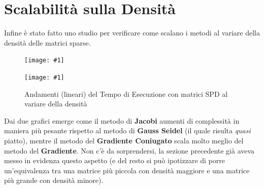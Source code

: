 \documentclass[a4paper,11pt,oneside, table]{article}
\newcommand{\putsubimage}[5] {
  \begin{minipage}{{#4}\linewidth}
	    \centering
      \texttt{[image: \#1]}
	    \caption{#2}\label{#3}
	\end{minipage}
}
\newcommand{\putimagecouple}[2] {
  \begin{figure}[!htb]
      \centering
      #1
      \hspace{0.5cm}
      #2
  \end{figure}
}
\begin{document}
\section{Scalabilit\`a sulla Densit\`a}

Infine \`e stato fatto uno studio per verificare come scalano i metodi al variare della densit\`a delle matrici sparse.

\putimagecouple
  {\putsubimage{./images/001-sparsity-density-elapsed.png}{Andamenti (lineari) del Tempo di Esecuzione con matrici RDD al variare della densit\`a}{png:001-sparsity-density-elapsed}{0.4}{0.99}}
  {\putsubimage{./images/002-sparsity-density-elapsed.png}{Andamenti (lineari) del Tempo di Esecuzione con matrici SPD al variare della densit\`a}{png:002-sparsity-density-elapsed}{0.4}{0.99}}

Dai due grafici emerge come il metodo di \textbf{Jacobi} aumenti di complessit\`a in maniera pi\`u pesante rispetto al metodo di \textbf{Gauss Seidel} (il quale risulta \textit{quasi} piatto), mentre il metodo del \textbf{Gradiente Coniugato} scala molto meglio del metodo del \textbf{Gradiente}.
Non c'\`e da sorprendersi, la sezione precedente gi\`a aveva messo in evidenza questo aspetto (e del resto si pu\`o ipotizzare di porre un'equivalenza tra una matrice pi\`u piccola con densit\`a maggiore e una matrice pi\`u grande con densit\`a minore).

\printbibliography[title={Bibliografia}]
\end{document}
